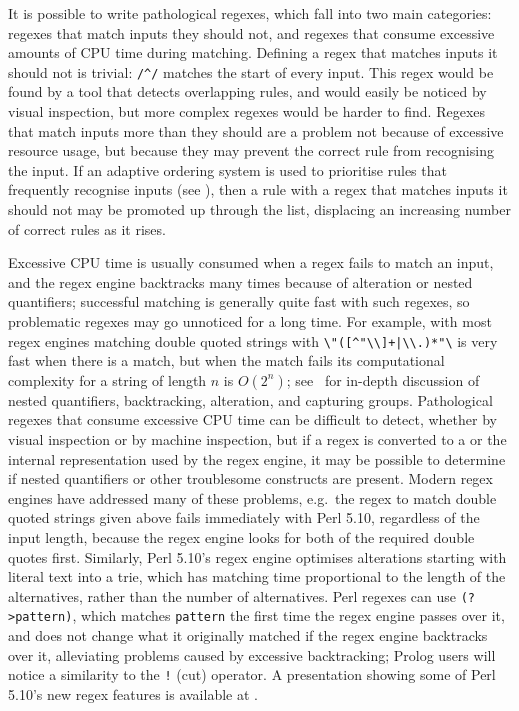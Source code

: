 It is possible to write pathological regexes, which fall into two main
categories: regexes that match inputs they should not, and regexes that
consume excessive amounts of CPU time during matching.  Defining a regex
that matches inputs it should not is trivial: \verb!/^/! matches the start
of every input.  This regex would be found by a tool that detects
overlapping rules, and would easily be noticed by visual inspection, but
more complex regexes would be harder to find.  Regexes that match inputs
more than they should are a problem not because of excessive resource
usage, but because they may prevent the correct rule from recognising the
input.  If an adaptive ordering system is used to prioritise rules that
frequently recognise inputs (see ), then a rule with a regex that matches inputs it should not
may be promoted up through the list, displacing an increasing number of
correct rules as it rises.

Excessive CPU time is usually consumed when a regex fails to match an
input, and the regex engine backtracks many times because of alteration or
nested quantifiers; successful matching is generally quite fast with such
regexes, so problematic regexes may go unnoticed for a long time.  For
example, with most regex engines matching double quoted strings with
\verb!\"([^"\\]+|\\.)*"\!  is very fast when there is a match, but when the
match fails its computational complexity for a string of length $n$ is
$O(2^{n})$; see~\cite{mastering-regular-expressions} for in-depth
discussion of nested quantifiers, backtracking, alteration, and capturing
groups.  Pathological regexes that consume excessive CPU time can be
difficult to detect, whether by visual inspection or by machine inspection,
but if a regex is converted to a  or the internal
representation used by the regex engine, it may be possible to determine if
nested quantifiers or other troublesome constructs are present.  Modern
regex engines have addressed many of these problems, e.g.\ the regex to
match double quoted strings given above fails immediately with Perl 5.10,
regardless of the input length, because the regex engine looks for both of
the required double quotes first.  Similarly, Perl 5.10's regex engine
optimises alterations starting with literal text into a trie, which has
matching time proportional to the length of the alternatives, rather than
the number of alternatives.  Perl regexes can use \verb!(?>pattern)!, which
matches \verb!pattern! the first time the regex engine passes over it, and
does not change what it originally matched if the regex engine backtracks
over it, alleviating problems caused by excessive backtracking; Prolog
users will notice a similarity to the \verb'!' (cut) operator.  A
presentation showing some of Perl 5.10's new regex features is available at
.

